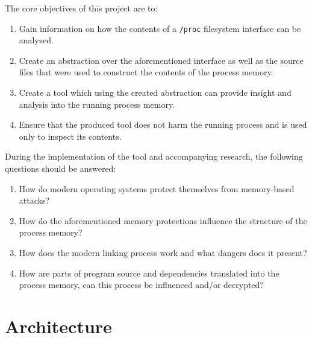 
The core objectives of this project are to:
\begin{enumerate}
    \item Gain information on how the contents of a \verb|/proc| filesystem interface can be analyzed.

    \item Create an abstraction over the aforementioned interface as well as the source files that were used to construct the contents of the process memory.

    \item Create a tool which using the created abstraction can provide insight and analysis into the running process memory.

    \item Ensure that the produced tool does not harm the running process and is used only to inspect its contents.

\end{enumerate}

During the implementation of the tool and accompanying research, the following questions should be answered:

\begin{enumerate}
    \item  How do modern operating systems protect themselves from memory-based attacks?

    \item  How do the aforementioned memory protections influence the structure of the process memory?

    \item  How does the modern linking process work and what dangers does it present?

    \item  How are parts of program source and dependencies translated into the process memory, can this process be influenced and/or decrypted?
\end{enumerate}


\section{Architecture}
\label{sec:architecture}

